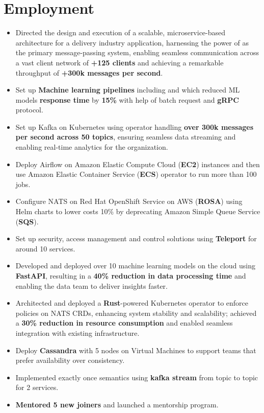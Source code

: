\section{Employment}

\begin{itemize}
      \item Directed the design and execution of a scalable, microservice-based architecture for a delivery industry application, harnessing the power of  as the primary message-passing system, enabling seamless communication across a vast client network of \textbf{+125 clients} and achieving a remarkable throughput of \textbf{+300k messages per second}.
      \item Set up \textbf{Machine learning pipelines} including  and
             which reduced ML models \textbf{response time} by \textbf{15\%}
            with help of batch request and \textbf{gRPC} protocol.
      \item Set up Kafka on Kubernetes using  operator handling \textbf{over 300k messages per second across 50 topics}, ensuring seamless data streaming and enabling real-time analytics for the organization.
      \item Deploy Airflow on Amazon Elastic Compute Cloud (\textbf{EC2}) instances and then use Amazon Elastic Container Service (\textbf{ECS}) operator to run more than 100 jobs.
      \item Configure NATS on Red Hat OpenShift Service on AWS (\textbf{ROSA})
            using Helm charts to lower costs 10\% by deprecating Amazon Simple Queue Service (\textbf{SQS}).
      \item Set up security, access management and control solutions using \textbf{Teleport} for around 10 services.
      \item Developed and deployed over 10 machine learning models on the cloud using \textbf{FastAPI}, resulting in a \textbf{40\% reduction in data processing time} and enabling the data team to deliver insights faster.
      \item Architected and deployed a \textbf{Rust}-powered Kubernetes operator to enforce policies on NATS CRDs, enhancing system stability and scalability; achieved a \textbf{30\% reduction in resource consumption} and enabled seamless integration with existing infrastructure.
      \item Deploy \textbf{Cassandra} with 5 nodes on Virtual Machines to support teams that prefer availability over consistency.
      \item Implemented exactly once semantics using \textbf{kafka stream} from topic to topic for 2 services.
      \item \textbf{Mentored 5 new joiners} and launched a mentorship program.
\end{itemize}


